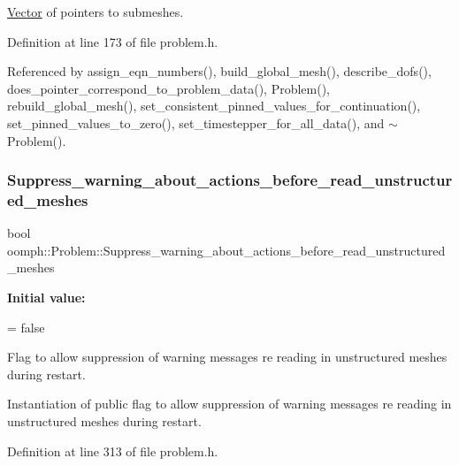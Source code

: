 \hyperlink{classoomph_1_1Vector}{Vector} of pointers to submeshes. 



Definition at line 173 of file problem.\+h.



Referenced by assign\+\_\+eqn\+\_\+numbers(), build\+\_\+global\+\_\+mesh(), describe\+\_\+dofs(), does\+\_\+pointer\+\_\+correspond\+\_\+to\+\_\+problem\+\_\+data(), Problem(), rebuild\+\_\+global\+\_\+mesh(), set\+\_\+consistent\+\_\+pinned\+\_\+values\+\_\+for\+\_\+continuation(), set\+\_\+pinned\+\_\+values\+\_\+to\+\_\+zero(), set\+\_\+timestepper\+\_\+for\+\_\+all\+\_\+data(), and $\sim$\+Problem().

\mbox{\label{classoomph_1_1Problem_a223a45fe6b1c80ee0109037b63e162f9}} 
\subsubsection{\texorpdfstring{Suppress\+\_\+warning\+\_\+about\+\_\+actions\+\_\+before\+\_\+read\+\_\+unstructured\+\_\+meshes}{Suppress\_warning\_about\_actions\_before\_read\_unstructured\_meshes}}
{\footnotesize\ttfamily bool oomph\+::\+Problem\+::\+Suppress\+\_\+warning\+\_\+about\+\_\+actions\+\_\+before\+\_\+read\+\_\+unstructured\+\_\+meshes\hspace{0.3cm}{\ttfamily [static]}}

{\bfseries Initial value\+:}
\begin{DoxyCode}
=
           \textcolor{keyword}{false}
\end{DoxyCode}


Flag to allow suppression of warning messages re reading in unstructured meshes during restart. 

Instantiation of public flag to allow suppression of warning messages re reading in unstructured meshes during restart. 

Definition at line 313 of file problem.\+h.



